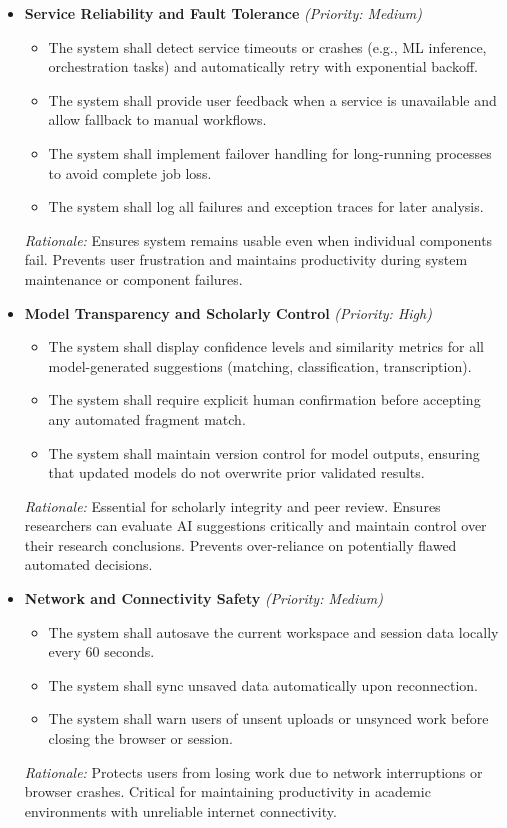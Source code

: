 \documentclass{article}
\begin{document}
\begin{itemize}
    \item \textbf{Service Reliability and Fault Tolerance} \textit{(Priority: Medium)}
    \begin{itemize}
        \item The system shall detect service timeouts or crashes (e.g., ML inference, orchestration tasks) and automatically retry with exponential backoff.
        \item The system shall provide user feedback when a service is unavailable and allow fallback to manual workflows.
        \item The system shall implement failover handling for long-running processes to avoid complete job loss.
        \item The system shall log all failures and exception traces for later analysis.
    \end{itemize}
    \textit{Rationale:} Ensures system remains usable even when individual components fail. Prevents user frustration and maintains productivity during system maintenance or component failures.

    \item \textbf{Model Transparency and Scholarly Control} \textit{(Priority: High)}
    \begin{itemize}
        \item The system shall display confidence levels and similarity metrics for all model-generated suggestions (matching, classification, transcription).
        \item The system shall require explicit human confirmation before accepting any automated fragment match.
        \item The system shall maintain version control for model outputs, ensuring that updated models do not overwrite prior validated results.
    \end{itemize}
    \textit{Rationale:} Essential for scholarly integrity and peer review. Ensures researchers can evaluate AI suggestions critically and maintain control over their research conclusions. Prevents over-reliance on potentially flawed automated decisions.

    \item \textbf{Network and Connectivity Safety} \textit{(Priority: Medium)}
    \begin{itemize}
        \item The system shall autosave the current workspace and session data locally every 60 seconds.
        \item The system shall sync unsaved data automatically upon reconnection.
        \item The system shall warn users of unsent uploads or unsynced work before closing the browser or session.
    \end{itemize}
    \textit{Rationale:} Protects users from losing work due to network interruptions or browser crashes. Critical for maintaining productivity in academic environments with unreliable internet connectivity.


\end{itemize}
\end{document}
